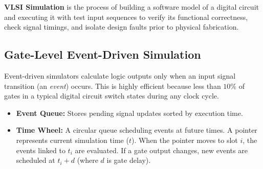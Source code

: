 \documentclass[12pt,a4paper]{article}
\begin{document}
\begin{tcolorbox}[defbox, title={VLSI Simulation}]
  \textbf{VLSI Simulation} is the process of building a software model of a digital circuit and executing it with test input sequences to verify its functional correctness, check signal timings, and isolate design faults prior to physical fabrication.
\end{tcolorbox}

\subsection{Gate-Level Event-Driven Simulation}
Event-driven simulators calculate logic outputs only when an input signal transition (an \textit{event}) occurs. This is highly efficient because less than $10\%$ of gates in a typical digital circuit switch states during any clock cycle.
\begin{itemize}[leftmargin=*, itemsep=2pt]
  \item \textbf{Event Queue:} Stores pending signal updates sorted by execution time.
  \item \textbf{Time Wheel:} A circular queue scheduling events at future times. A pointer represents current simulation time ($t$). When the pointer moves to slot $i$, the events linked to $t_i$ are evaluated. If a gate output changes, new events are scheduled at $t_i + d$ (where $d$ is gate delay).
\end{itemize}

\begin{tcolorbox}[tikzbox, title={Time Wheel Scheduler Concept}]
\centering
{}
\end{tcolorbox}
\end{document}

